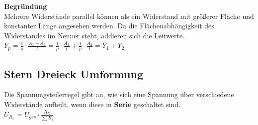					          \vspace{1em}

					          \textbf{Begründung} \\
										Mehrere Widerstände parallel können als ein Widerstand mit größerer Fläche und konstanter Länge angesehen werden. Da die Flächenabhängigkeit des Widerstandes im Nenner steht, addieren sich die Leitwerte. \\
											$\displaystyle Y_p = \frac{1}{\rho} \cdot \frac{A_1 + A_2}{l} = \frac{1}{\rho} \cdot \frac{A_1}{l}  + \frac{1}{\rho} \cdot \frac{A_2}{l}  = Y_1 + Y_2 $


										\begin{center}
										\end{center}




										\subsection{Stern Dreieck Umformung}



										\beginip
										Die Spannungsteilerregel gibt an, wie sich eine Spannung über verschiedene Widerstände aufteilt, wenn diese in \textbf{Serie} geschaltet sind. \\
											\formulaBegin
											$\displaystyle U_{R_x} = U_{ges} \cdot \frac{R_X}{\sum R_i} $
											\formulaEnd

